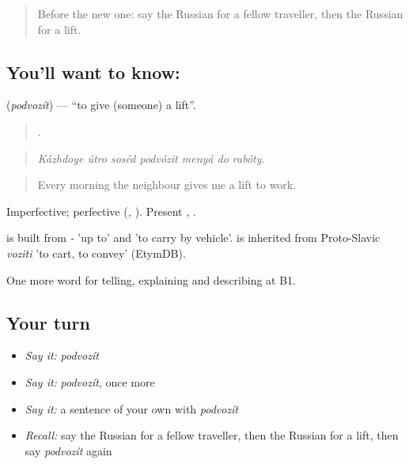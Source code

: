 \label{lesson:RU-C411-podvozit}



\begin{quote}
Before the new one: say the Russian for a fellow traveller, then the Russian for a lift.
\end{quote}

\subsection*{You'll want to know: }
\textbf{} (\emph{podvozít}) — \textquotedblleft{}to give (someone) a lift\textquotedblright{}.

\begin{quote}
      .
\end{quote}

\begin{quote}
\emph{Kázhdoye útro soséd podvózit menyá do rabóty.}
\end{quote}

\begin{quote}
Every morning the neighbour gives me a lift to work.
\end{quote}

Imperfective; perfective \emph{} (\emph{, }). Present \emph{, }.

\begin{cousinweb}
\emph{} is built from \emph{-} 'up to' and \emph{} 'to carry by vehicle'. \emph{} is inherited from Proto-Slavic \emph{voziti} 'to cart, to convey' (EtymDB).
\end{cousinweb}

\begin{grammarlens}[title={What you've built}]
One more word for telling, explaining and describing at B1.
\end{grammarlens}

\subsection*{Your turn}
\begin{itemize}
\raggedright
  \item \emph{Say it:} \emph{podvozít}
  \item \emph{Say it:} \emph{podvozít}, once more
  \item \emph{Say it:} a sentence of your own with \emph{podvozít}
  \item \emph{Recall:} say the Russian for a fellow traveller, then the Russian for a lift, then say \emph{podvozít} again
\end{itemize}

